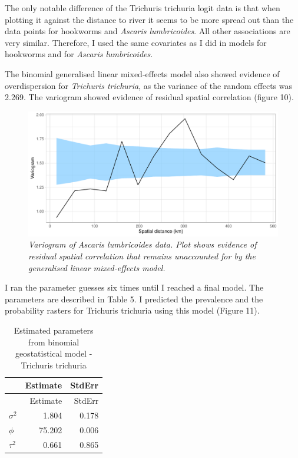 \documentclass[
]{article}
\begin{document}
The only notable difference of the Trichuris trichuria logit data is
that when plotting it against the distance to river it seems to be more
spread out than the data points for hookworms and \emph{Ascaris
lumbricoides}. All other associations are very similar. Therefore, I
used the same covariates as I did in models for hookworms and for
\emph{Ascaris lumbricoides}.

The binomial generalised linear mixed-effects model also showed evidence
of overdispersion for \emph{Trichuris trichuria}, as the variance of the
random effects was 2.269. The variogram showed evidence of residual
spatial correlation (figure 10).

\begin{figure}
\centering
\includegraphics{write_up_files/figure-latex/TT.variogram_2-1.pdf}
\caption{\textit{Variogram of Ascaris lumbricoides data. Plot shows evidence of residual spatial correlation that remains unaccounted for by the generalised linear mixed-effects model.}}
\end{figure}

I ran the parameter guesses six times until I reached a final model. The
parameters are described in Table 5. I predicted the prevalence and the
probability rasters for Trichuris trichuria using this model (Figure
11).

\begin{longtable}[]{@{}lrr@{}}
\caption{Estimated parameters from binomial geostatistical model -
Trichuris trichuria}\tabularnewline
\toprule
& Estimate & StdErr \\
\midrule
\endfirsthead
\toprule
& Estimate & StdErr \\
\midrule
\endhead
\(\sigma^2\) & 1.804 & 0.178 \\
\(\phi\) & 75.202 & 0.006 \\
\(\tau^2\) & 0.661 & 0.865 \\
\bottomrule
\end{longtable}
\end{document}
